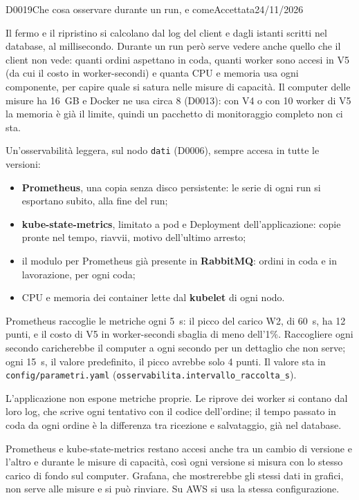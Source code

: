 \begin{decisione}{D0019}{Che cosa osservare durante un run, e come}{Accettata}{24/11/2026}

\contesto
Il fermo e il ripristino si calcolano dal log del client e dagli istanti scritti nel database, al millisecondo. Durante un run però serve vedere anche quello che il client non vede: quanti ordini aspettano in coda, quanti worker sono accesi in V5 (da cui il costo in worker-secondi) e quanta CPU e memoria usa ogni componente, per capire quale si satura nelle misure di capacità. Il computer delle misure ha 16~GB e Docker ne usa circa 8 (D0013): con V4 o con 10 worker di V5 la memoria è già il limite, quindi un pacchetto di monitoraggio completo non ci sta.

\scelta
Un'osservabilità leggera, sul nodo \texttt{dati} (D0006), sempre accesa in tutte le versioni:
\begin{itemize}
  \item \textbf{Prometheus}, una copia senza disco persistente: le serie di ogni run si esportano subito, alla fine del run;
  \item \textbf{kube-state-metrics}, limitato a pod e Deployment dell'applicazione: copie pronte nel tempo, riavvii, motivo dell'ultimo arresto;
  \item il modulo per Prometheus già presente in \textbf{RabbitMQ}: ordini in coda e in lavorazione, per ogni coda;
  \item CPU e memoria dei container lette dal \textbf{kubelet} di ogni nodo.
\end{itemize}
Prometheus raccoglie le metriche ogni 5~s: il picco del carico W2, di 60~s, ha 12 punti, e il costo di V5 in worker-secondi sbaglia di meno dell'1\%. Raccogliere ogni secondo caricherebbe il computer a ogni secondo per un dettaglio che non serve; ogni 15~s, il valore predefinito, il picco avrebbe solo 4 punti. Il valore sta in \texttt{config/parametri.yaml} (\texttt{osservabilita.intervallo\_raccolta\_s}).

L'applicazione non espone metriche proprie. Le riprove dei worker si contano dal loro log, che scrive ogni tentativo con il codice dell'ordine; il tempo passato in coda da ogni ordine è la differenza tra ricezione e salvataggio, già nel database.

\conseguenze
Prometheus e kube-state-metrics restano accesi anche tra un cambio di versione e l'altro e durante le misure di capacità, così ogni versione si misura con lo stesso carico di fondo sul computer. Grafana, che mostrerebbe gli stessi dati in grafici, non serve alle misure e si può rinviare. Su AWS si usa la stessa configurazione.

\end{decisione}
